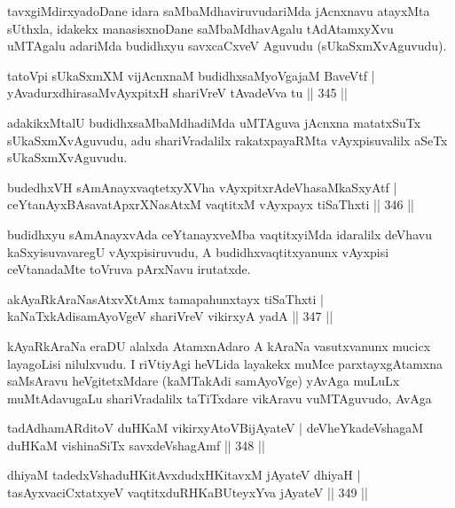 \begin{artha}
tavxgiMdirxyadoDane idara saMbaMdhaviruvudariMda jAcnxnavu atayxMta sUthxla, idakekx manasisxnoDane saMbaMdhavAgalu tAdAtamxyXvu uMTAgalu adariMda budidhxyu savxcaCxveV Aguvudu (sUkaSxmXvAguvudu).
\end{artha}

\begin{shl}
tatoV\s pi sUkaSxmXM vijAcnxnaM budidhxsaMyoVgajaM BaveVtf |
yAvadurxdhirasaMvAyxpitxH shariVreV tAvadeVva tu \hfill || 345 ||
\end{shl}

\begin{artha}
adakikxMtalU budidhxsaMbaMdhadiMda uMTAguva jAcnxna matatxSuTx sUkaSxmXvAguvudu, adu shariVradalilx rakatxpayaRMta vAyxpisuvalilx aSeTx sUkaSxmXvAguvudu.
\end{artha}

\begin{shl}
budedhxVH sAmAnayxvaqtetxyXVha vAyxpitxrAdeVhasaMkaSxyAtf |
ceYtanAyxBAsavatApxrXNasAtxM vaqtitxM vAyxpayx tiSaThxti \hfill || 346 ||
\end{shl}

\begin{artha}
budidhxyu sAmAnayxvAda ceYtanayxveMba vaqtitxyiMda idaralilx deVhavu kaSxyisuvavaregU vAyxpisiruvudu, A budidhxvaqtitxyanunx vAyxpisi ceVtanadaMte toVruva pArxNavu irutatxde.
\end{artha}

\begin{shl}
akAyaRkAraNasAtxvXtAmx tamapahunxtayx tiSaThxti |
kaNaTxkAdisamAyoVgeV shariVreV vikirxyA yadA \hfill || 347 ||
\end{shl}

\begin{artha}
kAyaRkAraNa eraDU alalxda AtamxnAdaro A kAraNa vasutxvanunx mucicx layagoLisi nilulxvudu. I riVtiyAgi heVLida layakekx muMce parxtayxgAtamxna saMsAravu heVgitetxMdare (kaMTakAdi samAyoVge) yAvAga muLuLx muMtAdavugaLu shariVradalilx taTiTxdare vikAravu vuMTAguvudo, AvAga
\end{artha}

\begin{shl}
tadA\s dhamARditoV duHKaM vikirxyAtoV\s BijAyateV |
deVheYkadeVshagaM duHKaM vishinaSiTx savxdeVshagAmf \hfill || 348 ||
\end{shl}

\begin{shl}
dhiyaM tadedxVshaduHKitAvxdudxHKitavxM jAyateV dhiyaH |
tasAyxvaciCxtatxyeV vaqtitxduRHKaBUteyxYva jAyateV \hfill || 349 ||
\end{shl}

